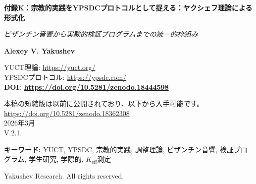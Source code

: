 \documentclass[12pt,a4paper]{article}
\begin{document}
	
	\begin{titlepage}
		\begin{center}
			\vspace*{0cm}
			
			\Huge\textbf{付録K：宗教的実践をYPSDCプロトコルとして捉える：ヤクシェフ理論による形式化}
			
			\vspace{1cm}
			
			\small\textit{ビザンチン音響から実験的検証プログラムまでの統一的枠組み}
			
			\vspace{0.5cm}
			
			\small\textbf{Alexey V. Yakushev}
			
			\vspace{0cm}
			
			YUCT理論: \url{https://yuct.org/}\\
			YPSDCプロトコル: \url{https://ypsdc.com/}\\
			
			\vspace{2cm}
			\textbf{DOI: \url{https://doi.org/10.5281/zenodo.18444598}}\\
			
			\vspace{1cm}
			
			\vspace{0cm}
			\large 
			本稿の短縮版は以前に公開されており、以下から入手可能です。\\ \url{https://doi.org/10.5281/zenodo.18362308}\\
			\vspace{1cm}
			2026年3月 \\ \large V.2.1.
			\newpage
			\begin{abstract}
				\noindent
				本稿は、ヤクシェフ統一調整理論（YUCT）とYPSDC（ヤクシェフ同期分散調整プロトコル）の観点から宗教的実践を包括的に形式化する。第1部では、宗教儀式が事前配布辞書を用いた高度に最適化された調整プロトコルとして機能することを示し、ビザンチン教会の音響が調整効率のための建築的最適化の典型例であることを実証する。第2部では、YUCTフレームワークの極端な統合力を概説し、実験的検証のための詳細な研究プログラムを提示し、学生研究を科学的検証の要として強調する。この枠組みは、測定可能な指標（$K_{\mathrm{eff}}$）、検証可能な予測、物理学・生物学から社会学・宗教学までの学際的応用を提供する。
			\end{abstract}
			
			\vspace{0cm}
			
			\noindent
			\small\textbf{キーワード:} YUCT, YPSDC, 宗教的実践, 調整理論, ビザンチン音響, 検証プログラム, 学生研究, 学際的, $K_{\mathrm{eff}}$測定
			
			\vspace{0.5cm}
			
			\noindent
			 Yakushev Research. All rights reserved.
		\end{center}
	\end{titlepage}
	
\end{document}
